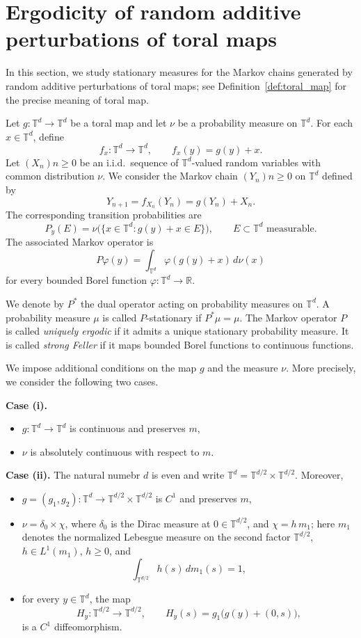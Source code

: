 \documentclass[a4paper,12pt,reqno]{amsart}
\numberwithin{equation}{section}
\newcommand{\Rr}{{\mathbb{R}}}
\newcommand{\Tt}{{\mathbb{T}}}
\begin{document}
\section{Ergodicity of random additive perturbations of toral maps}
\label{se:ergodicity}

In this section, we study stationary measures for the Markov chains generated by random additive perturbations of toral maps; see Definition~\ref{def:toral_map} for the precise meaning of toral map.

Let $g\colon\Tt^d\to\Tt^d$ be a toral map and let $\nu$ be a probability measure on $\Tt^d$. For each $x\in\Tt^d$, define
\[
f_x\colon\Tt^d\to\Tt^d,
\qquad
f_x(y)=g(y)+x.
\]
Let $(X_n){n\geq 0}$ be an i.i.d.\ sequence of $\Tt^d$-valued random variables with common distribution $\nu$. We consider the Markov chain $(Y_n){n\geq 0}$ on $\Tt^d$ defined by
\[
Y_{n+1}=f_{X_n}(Y_n)=g(Y_n)+X_n.
\]
The corresponding transition probabilities are
\[
P_y(E)=\nu\bigl(\{x\in\Tt^d:g(y)+x\in E\}\bigr),
\qquad E\subset \Tt^d \text{ measurable}.
\]
The associated Markov operator is
\[
P\varphi(y)=\int_{\Tt^d}\varphi(g(y)+x)\,d\nu(x)
\]
for every bounded Borel function $\varphi\colon\Tt^d\to\Rr$.

We denote by $P^*$ the dual operator acting on probability measures on $\Tt^d$. A probability measure $\mu$ is called $P$-stationary if $P^*\mu=\mu$. The Markov operator $P$ is called \emph{uniquely ergodic} if it admits a unique stationary probability measure. It is called \emph{strong Feller} if it maps
bounded Borel functions to continuous functions.

We impose additional conditions on the map $g$ and the measure $\nu$. More precisely, we consider the following two cases.

\medskip

\noindent\textbf{Case (i).}
\begin{itemize}
\item $g \colon \Tt^d \to \Tt^d$ is continuous and preserves $m$,
\item $\nu$ is absolutely continuous with respect to $m$.
\end{itemize}

\medskip

\noindent\textbf{Case (ii).}
The natural numebr $d$ is even and write $\Tt^d=\Tt^{d/2}\times\Tt^{d/2}$. Moreover,
\begin{itemize}
\item $g=(g_1,g_2)\colon\Tt^d\to\Tt^{d/2}\times\Tt^{d/2}$ is $C^1$ and
preserves $m$,
\item $\nu=\delta_0\times \chi$, where $\delta_0$ is the Dirac measure at $0\in\Tt^{d/2}$, and $\chi=h\,m_1$; here $m_1$ denotes the normalized Lebesgue measure on the second factor $\Tt^{d/2}$, $h\in L^1(m_1)$, $h\geq 0$, and
\[
\int_{\Tt^{d/2}}h(s)\,dm_1(s)=1,
\]
\item for every $y\in\Tt^d$, the map
\[
H_y\colon\Tt^{d/2}\to\Tt^{d/2},
\qquad
H_y(s)=g_1\bigl(g(y)+(0,s)\bigr),
\]
is a $C^1$ diffeomorphism.
\end{itemize}
\end{document}
